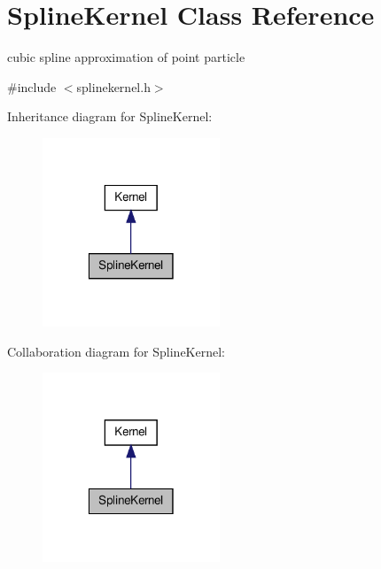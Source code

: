 \hypertarget{classSplineKernel}{\section{\-Spline\-Kernel \-Class \-Reference}
\label{classSplineKernel}
}


cubic spline approximation of point particle  




{\ttfamily \#include $<$splinekernel.\-h$>$}



\-Inheritance diagram for \-Spline\-Kernel\-:
\nopagebreak
\begin{figure}[H]
\begin{center}
\leavevmode
\includegraphics[width=150pt]{classSplineKernel__inherit__graph}
\end{center}
\end{figure}


\-Collaboration diagram for \-Spline\-Kernel\-:
\nopagebreak
\begin{figure}[H]
\begin{center}
\leavevmode
\includegraphics[width=150pt]{classSplineKernel__coll__graph}
\end{center}
\end{figure}
